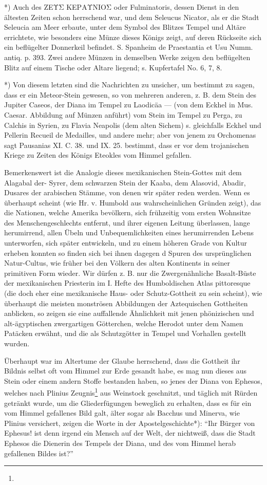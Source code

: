 \documentclass[a4paper, 11pt, oneside, polutonikogreek, german]{article}
\begin{document}
*) Auch des ΖΕΥΣ ΚΕΡΑΥNIOΣ oder Fulminatoris, dessen Dienst in den ältesten Zeiten schon herrschend war, und dem Seleucus Nicator, als er die Stadt Seleucia am Meer erbaute, unter dem Symbol des Blitzes Tempel und Altäre errichtete, wie besonders eine Münze dieses Königs zeigt, auf deren Rückseite sich ein beflügelter Donnerkeil befindet. S. Spanheim de Praestantia et Usu Numm. antiq. p. 393. Zwei andere Münzen in demselben Werke zeigen den beflügelten Blitz auf einem Tische oder Altare liegend; s. Kupfertafel No. 6, 7, 8.

*) Von diesem letzten sind die Nachrichten zu unsicher, um bestimmt zu sagen, dass er ein Meteor-Stein gewesen, so von mehreren anderen, z. B. dem Stein des Jupiter Caseos, der Diana im Tempel zu Laodicäa --- (von dem Eckhel in Mus. Caesar. Abbildung auf Münzen anführt) vom Stein im Tempel zu Perga, zu Calchis in Syrien, zu Flavia Neapolis (dem alten Sichem) s. gleichfalls Eckhel und Pellerin Recueil de Medailles, und andere mehr; aber von jenem zu Orchomenas sagt Pausanias XI. C. 38. und IX. 25. bestimmt, dass er vor dem trojanischen Kriege zu Zeiten des Königs Eteokles vom Himmel gefallen.

Bemerkenswert ist die Analogie dieses mexikanischen Stein-Gottes mit dem Alagabal der- Syrer, dem schwarzen Stein der Kaaba, dem Alasovid, Abadir, Dusares der arabischen Stämme, von denen wir später reden werden. Wenn es überhaupt scheint (wie Hr. v. Humbold aus wahrscheinlichen Gründen zeigt), das die Nationen, welche Amerika bevölkern, sich frühzeitig vom ersten Wohnsitze des Menschengeschlechts entfernt, und ihrer eigenen Leitung überlassen, lange herumirrend, allen Übeln und Unbequemlichkeiten eines herumirrenden Lebens unterworfen, sich später entwickeln, und zu einem höheren Grade von Kultur erheben konnten so finden sich bei ihnen dagegen d Spuren des ursprünglichen Natur-Cultus, wie früher bei den Völkern des alten Kontinents in seiner primitiven Form wieder. Wir dürfen z. B. nur die Zwergenähnliche Basalt-Büste der mexikanischen Priesterin im I. Hefte des Humboldischen Atlas pittoresque (die doch eher eine mexikanische Haus- oder Schutz-Gottheit zu sein scheint), wie überhaupt die meisten monströsen Abbildungen der Aztequischen Gottheiten anblicken, so zeigen sie eine auffallende Ähnlichkeit mit jenen phönizischen und alt-ägyptischen zwergartigen Götterchen, welche Herodot unter dem Namen Patäcken erwähnt, und die als Schutzgötter in Tempel und Vorhallen gestellt wurden.

Überhaupt war im Altertume der Glaube herrschend, dass die Gottheit ihr Bildnis selbst oft vom Himmel zur Erde gesandt habe, es mag nun dieses aus Stein oder einem andern Stoffe bestanden haben, so jenes der Diana von Ephesos, welches nach Plinius Zeugnis\footnote{} aus Weinstock geschnitzt, und täglich mit Rürden getränkt wurde, um die Gliederfügungen beweglich zu erhalten, dass es für ein vom Himmel gefallenes Bild galt, älter sogar als Bacchus und Minerva, wie Plinius versichert, zeigen die Worte in der Apostelgeschichte*): "`Ihr Bürger von Ephesus! ist denn irgend ein Mensch auf der Welt, der nichtweiß, dass die Stadt Ephesos die Dienerin des Tempels der Diana, und des vom Himmel herab gefallenen Bildes ist?"'
\end{document}
